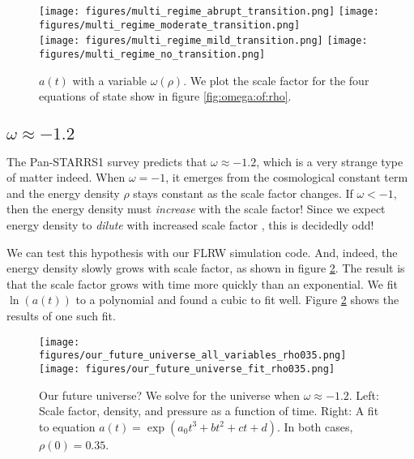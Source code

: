 \documentclass[]{article}
\begin{document}
\begin{figure}[htb]
  \begin{center}
    \leavevmode
    \hspace{-.2cm}
     \texttt{[image: figures/multi\_regime\_abrupt\_transition.png]}
     \hspace{-0.3cm}
     \texttt{[image: figures/multi\_regime\_moderate\_transition.png]}\\
     \vspace{0.2cm}
     \hspace{-.2cm}
     \texttt{[image: figures/multi\_regime\_mild\_transition.png]}
     \hspace{-0.3cm}
     \texttt{[image: figures/multi\_regime\_no\_transition.png]}
     \caption[$a(t)$ with a variable $\omega(\rho)$]{$a(t)$ with a
       variable $\omega(\rho)$. We plot the scale factor for the four
       equations of state show in figure \ref{fig:omega:of:rho}.}
     \label{fig:a:varying:omega}
  \end{center}
\end{figure}

\subsection{$\omega \approx -1.2$}
\label{subsec:label:omega:1.2}

The Pan-STARRS1 survey \cite{Pan-STARRS1} predicts that $\omega
\approx -1.2$, which is a very strange type of matter indeed. When
$\omega=-1$, it emerges from the cosmological constant term and the
energy density $\rho$ stays constant as the scale factor changes. If
$\omega<-1$, then the energy density must \textit{increase} with the
scale factor! Since we expect energy density to \textit{dilute} with
increased scale factor \cite{Carroll,Kempf}, this is decidedly odd!

We can test this hypothesis with our FLRW simulation code. And,
indeed, the energy density slowly grows with scale factor, as shown in
figure \ref{fig:omega:1.2}. The result is that the scale factor grows
with time more quickly than an exponential. We fit $\ln(a(t))$ to a
polynomial and found a cubic to fit well. Figure \ref{fig:omega:1.2}
shows the results of one such fit.
\begin{figure}[htb]
  \begin{center}
    \leavevmode
    \hspace{-.2cm}
     \texttt{[image: figures/our\_future\_universe\_all\_variables\_rho035.png]}
     \hspace{-0.3cm}
     \texttt{[image: figures/our\_future\_universe\_fit\_rho035.png]}
     \caption[Our Future Universe?]{Our future universe? We solve for
       the universe when $\omega \approx -1.2$. Left: Scale factor,
       density, and pressure as a function of time. Right: A fit to
       equation $a(t) = \exp(a_0 t^3 + b t^2 + c t + d)$. In both
       cases, $\rho(0) = 0.35$.}
    \label{fig:omega:1.2}
  \end{center}
\end{figure}
\end{document}
